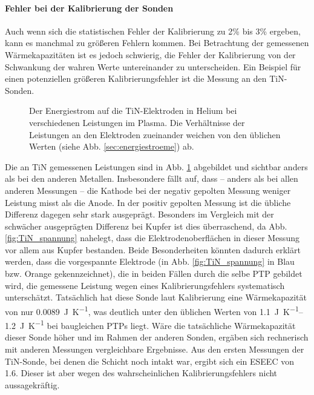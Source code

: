  \paragraph{Fehler bei der Kalibrierung der Sonden }
 Auch wenn sich die statistischen Fehler der Kalibrierung zu 2\% bis 3\% ergeben, kann es manchmal zu größeren Fehlern kommen. Bei Betrachtung der gemessenen Wärmekapazitäten ist es jedoch schwierig, die Fehler der Kalibrierung von der Schwankung der wahren Werte untereinander zu unterscheiden. Ein Beispiel für einen potenziellen größeren Kalibrierungsfehler ist die Messung an den TiN-Sonden. 
 
 \begin{figure}[H]
 	\centering
 	
 	\caption{Der Energiestrom auf die TiN-Elektroden in Helium bei verschiedenen Leistungen im Plasma. Die Verhältnisse der Leistungen an den Elektroden zueinander weichen von den üblichen Werten (siehe Abb. \ref{sec:energiestroeme}) ab.}
 	\label{fig:einzelleistungenTiN}
 \end{figure}

Die an TiN gemessenen Leistungen sind in Abb. \ref{fig:einzelleistungenTiN} abgebildet und sichtbar anders als bei den anderen Metallen. Insbesondere fällt auf, dass – anders als bei allen anderen Messungen – die Kathode bei der negativ gepolten Messung weniger Leistung misst als die Anode. In der positiv gepolten Messung ist die übliche Differenz dagegen sehr stark ausgeprägt. Besonders im Vergleich mit der schwächer ausgeprägten Differenz bei Kupfer ist dies überraschend, da Abb. \ref{fig:TiN_spannung} nahelegt, dass die Elektrodenoberflächen in dieser Messung vor allem aus Kupfer bestanden. Beide Besonderheiten könnten dadurch erklärt werden, dass die vorgespannte Elektrode (in Abb. \ref{fig:TiN_spannung} in Blau bzw. Orange gekennzeichnet), die in beiden Fällen durch die selbe PTP gebildet wird, die gemessene Leistung wegen eines Kalibrierungsfehlers systematisch unterschätzt. Tatsächlich hat diese Sonde laut Kalibrierung eine Wärmekapazität von nur \qty{0,0089}{J.K^{-1}}, was deutlich unter den üblichen Werten von \qtyrange{1,1}{1,2}{J.K^{-1}} bei baugleichen PTPs liegt. Wäre die tatsächliche Wärmekapazität dieser Sonde höher und im Rahmen der anderen Sonden, ergäben sich rechnerisch mit anderen Messungen vergleichbare Ergebnisse. Aus den ersten Messungen der TiN-Sonde, bei denen die Schicht noch intakt war, ergibt sich ein ESEEC von \num{1,6}. Dieser ist aber wegen des wahrscheinlichen Kalibrierungsfehlers nicht aussagekräftig. 

